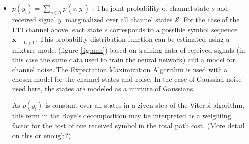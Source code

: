 \documentclass[12pt,a4paper]{article}
\begin{document}
\begin{itemize}
\item $p(y_{\mathrm{i}}) = \sum_{s \in \textit{$\mathcal{S}$}}p(s,y_{\mathrm{i}})$
: The joint probability of channel state $s$ and received signal $y_{\mathrm{i}}$ marginalized over all channel states $\mathcal{S}$. For the case of the LTI channel above, each state $s$ corresponds to a possible symbol sequence $\mathbf{x}_{\mathrm{i-L+1}}^{\mathrm{i}}$. This probability distribution function can be estimated using a mixture-model (figure \ref{fig:mm}) based on training data of received signals (in this case the same data used to train the neural network) and a model for channel noise. The Expectation Maximization Algorithm \cite{ng2000cs229} is used with a chosen model for the channel states and noise. 
In the case of Gaussian noise used here, the states are modeled as a mixture of Gaussians.
%
%
\par As $p(y_{\mathrm{i}})$ is constant over all states in a given step of the Viterbi algorithm, this term in the Baye's decomposition may be interpreted as a weighting factor for the cost of one received symbol in the total path cost. (More detail on this or enough?)




\end{itemize}
\end{document}
